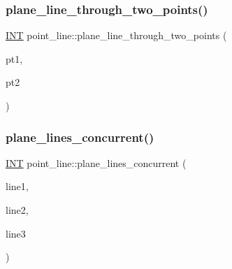 \subsubsection{\texorpdfstring{plane\+\_\+line\+\_\+through\+\_\+two\+\_\+points()}{plane\_line\_through\_two\_points()}}
{\footnotesize\ttfamily \mbox{\hyperlink{galois_8h_a09fddde158a3a20bd2dcadb609de11dc}{I\+NT}} point\+\_\+line\+::plane\+\_\+line\+\_\+through\+\_\+two\+\_\+points (\begin{DoxyParamCaption}\item[{\mbox{\hyperlink{galois_8h_a09fddde158a3a20bd2dcadb609de11dc}{I\+NT}}}]{pt1,  }\item[{\mbox{\hyperlink{galois_8h_a09fddde158a3a20bd2dcadb609de11dc}{I\+NT}}}]{pt2 }\end{DoxyParamCaption})}

\mbox{\label{classpoint__line_a11c77fefb10829a293fea2c09b1c22e7}} 
\subsubsection{\texorpdfstring{plane\+\_\+lines\+\_\+concurrent()}{plane\_lines\_concurrent()}}
{\footnotesize\ttfamily \mbox{\hyperlink{galois_8h_a09fddde158a3a20bd2dcadb609de11dc}{I\+NT}} point\+\_\+line\+::plane\+\_\+lines\+\_\+concurrent (\begin{DoxyParamCaption}\item[{\mbox{\hyperlink{galois_8h_a09fddde158a3a20bd2dcadb609de11dc}{I\+NT}}}]{line1,  }\item[{\mbox{\hyperlink{galois_8h_a09fddde158a3a20bd2dcadb609de11dc}{I\+NT}}}]{line2,  }\item[{\mbox{\hyperlink{galois_8h_a09fddde158a3a20bd2dcadb609de11dc}{I\+NT}}}]{line3 }\end{DoxyParamCaption})}

\mbox{\label{classpoint__line_a55a4dc7b433732a85d56f7370c534b90}} 
